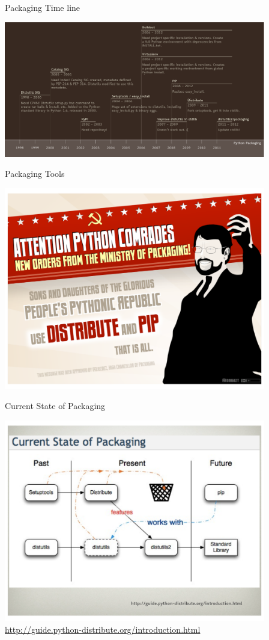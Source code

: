 \documentclass{beamer}
\begin{document}
\begin{frame}[fragile]{Packaging Time line}

{\centering
\includegraphics[width=4.5in]{PackagingTimeline.pdf}
}
\end{frame} 

\begin{frame}[fragile]{Packaging Tools}

{\centering
\includegraphics[width=4.5in]{packaging1.pdf}
}

\end{frame} 

\begin{frame}[fragile]{Current State of Packaging}

{\centering
\includegraphics[width=4.5in]{PackagingCurrentState.pdf}
}
\vfill
\url{http://guide.python-distribute.org/introduction.html}
\end{frame} 
\end{document}
